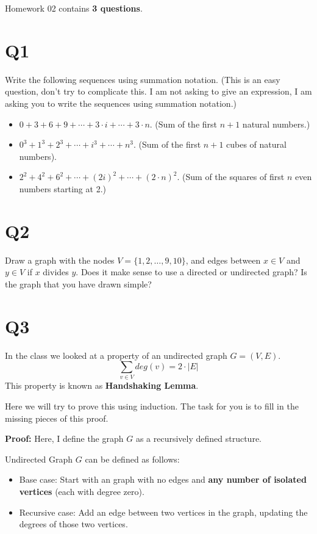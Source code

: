 \documentclass[12pt]{exam}
\begin{document}
Homework 02 contains \textbf{3 questions}.

\section{Q1}
Write the following sequences using summation notation. (This is an easy question, don't try to complicate this. I am not asking to give an expression, I am asking you to write the sequences using summation notation.)

\begin{itemize}
    \item $0 + 3 + 6 + 9 + \cdots + 3\cdot i + \cdots + 3\cdot n.$ (Sum of the first $n+1$ natural numbers.)
    \item $0^3 + 1^3 + 2^3 + \cdots + i^3 + \cdots + n^3.$ (Sum of the first $n+1$ cubes of natural numbers).
    \item $2^2 + 4^2 + 6^2 + \cdots + (2i)^2 + \cdots + (2\cdot n)^2.$ (Sum of the squares of first $n$ even numbers starting at 2.)
\end{itemize}

\section{Q2} 
Draw a graph with the nodes $V = \{1,2,\ldots, 9,10\}$, and edges between $x \in V$ and $y \in V$ if $x$ divides $y$. Does it make sense to use a directed or undirected graph? Is the graph that you have drawn simple?


\section{Q3}
In the class we looked at a property of an undirected graph $G=(V,E)$.
\[\sum_{v \in V} deg(v) = 2\cdot |E|\]
This property is known as \textbf{Handshaking Lemma}.

Here we will try to prove this using induction. The task for you is to fill in the missing pieces of this proof.

\textbf{Proof:} Here, I define the graph $G$ as a recursively defined structure. 

Undirected Graph $G$ can be defined as follows:
\begin{itemize}
    \item Base case: Start with an graph with no edges and \textbf{any number of isolated vertices} (each with degree zero).
    \item Recursive case: Add an edge between two vertices in the graph, updating the degrees of those two vertices.
\end{itemize}
\end{document}
